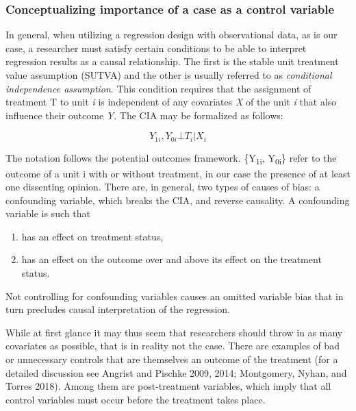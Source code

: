 \documentclass[
  11pt,
]{article}
\providecommand{\tightlist}{%
  \setlength{\itemsep}{0pt}\setlength{\parskip}{0pt}}
\begin{document}
\hypertarget{conceptualizing-importance-of-a-case-as-a-control-variable}{%
\subsubsection{Conceptualizing importance of a case as a control
variable}\label{conceptualizing-importance-of-a-case-as-a-control-variable}}

In general, when utilizing a regression design with observational data,
as is our case, a researcher must satisfy certain conditions to be able
to interpret regression results as a causal relationship. The first is
the stable unit treatment value assumption (SUTVA) and the other is
usually referred to as \emph{conditional independence assumption}. This
condition requires that the assignment of treatment T to unit \emph{i}
is independent of any covariates \emph{X} of the unit \emph{i} that also
influence their outcome \emph{Y}. The CIA may be formalized as follows:

\[
{Y_{1i}, Y_{0i}} {\bot} T_{i}|X_{i}
\]

The notation follows the potential outcomes framework.
\{Y\textsubscript{1i}, Y\textsubscript{0i}\} refer to the outcome of a
unit i with or without treatment, in our case the presence of at least
one dissenting opinion. There are, in general, two types of causes of
bias: a confounding variable, which breaks the CIA, and reverse
causality. A confounding variable is such that

\begin{enumerate}
\def\labelenumi{(\arabic{enumi})}
\tightlist
\item
  has an effect on treatment status,
\item
  has an effect on the outcome over and above its effect on the
  treatment status.
\end{enumerate}

Not controlling for confounding variables causes an omitted variable
bias that in turn precludes causal interpretation of the regression.

While at first glance it may thus seem that researchers should throw in
as many covariates as possible, that is in reality not the case. There
are examples of bad or unnecessary controls that are themselves an
outcome of the treatment (for a detailed discussion see Angrist and
Pischke 2009, 2014; Montgomery, Nyhan, and Torres 2018). Among them are
post-treatment variables, which imply that all control variables must
occur before the treatment takes place.
\end{document}
